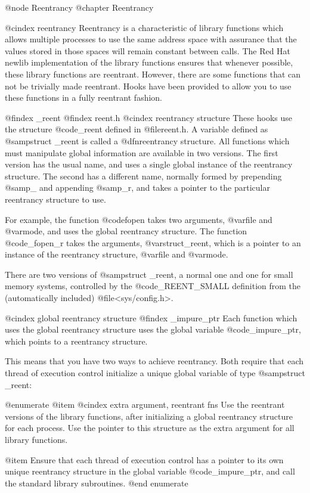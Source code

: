 @node Reentrancy
@chapter Reentrancy

@cindex reentrancy
Reentrancy is a characteristic of library functions which allows multiple
processes to use the same address space with assurance that the values stored
in those spaces will remain constant between calls. The Red Hat
newlib implementation of the library functions ensures that
whenever possible, these library functions are reentrant.  However,
there are some functions that can not be trivially made reentrant.
Hooks have been provided to allow you to use these functions in a fully
reentrant fashion.

@findex _reent
@findex reent.h
@cindex reentrancy structure
These hooks use the structure @code{_reent} defined in @file{reent.h}.
A variable defined as @samp{struct _reent} is called a @dfn{reentrancy
structure}.  All functions which must manipulate global information are
available in two versions.  The first version has the usual name, and
uses a single global instance of the reentrancy structure.  The second
has a different name, normally formed by prepending @samp{_} and
appending @samp{_r}, and takes a pointer to the particular reentrancy
structure to use.

For example, the function @code{fopen} takes two arguments, @var{file}
and @var{mode}, and uses the global reentrancy structure.  The function
@code{_fopen_r} takes the arguments, @var{struct_reent}, which is a
pointer to an instance of the reentrancy structure, @var{file}
and @var{mode}.

There are two versions of @samp{struct _reent}, a normal one and one
for small memory systems, controlled by the @code{_REENT_SMALL}
definition from the (automatically included) @file{<sys/config.h>}.

@cindex global reentrancy structure
@findex _impure_ptr
Each function which uses the global reentrancy structure uses the global
variable @code{_impure_ptr}, which points to a reentrancy structure.

This means that you have two ways to achieve reentrancy.  Both require
that each thread of execution control initialize a unique global
variable of type @samp{struct _reent}:

@enumerate
@item
@cindex extra argument, reentrant fns
Use the reentrant versions of the library functions, after initializing
a global reentrancy structure for each process.  Use the pointer to this
structure as the extra argument for all library functions.

@item
Ensure that each thread of execution control has a pointer to its own
unique reentrancy structure in the global variable @code{_impure_ptr},
and call the standard library subroutines.
@end enumerate

